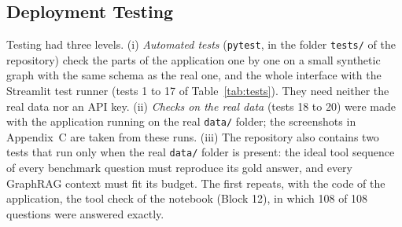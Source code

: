 \documentclass[12pt, a4paper]{article}
\begin{document}
\subsection{Deployment Testing}
Testing had three levels. (i) \emph{Automated tests} (\texttt{pytest}, in the folder \texttt{tests/} of the repository) check the parts of the application one by one on a small synthetic graph with the same schema as the real one, and the whole interface with the Streamlit test runner (tests 1 to 17 of Table~\ref{tab:tests}). They need neither the real data nor an API key. (ii) \emph{Checks on the real data} (tests 18 to 20) were made with the application running on the real \texttt{data/} folder; the screenshots in Appendix~C are taken from these runs. (iii) The repository also contains two tests that run only when the real \texttt{data/} folder is present: the ideal tool sequence of every benchmark question must reproduce its gold answer, and every GraphRAG context must fit its budget. The first repeats, with the code of the application, the tool check of the notebook (Block 12), in which 108 of 108 questions were answered exactly.
\end{document}
